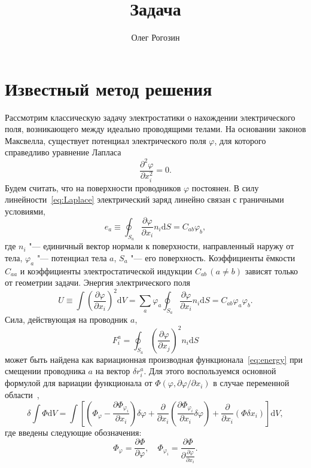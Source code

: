 \documentclass{article}
\title{Задача}
\author{Олег Рогозин}
\theoremstyle{plain}
\newcommand{\dd}{\mathrm{d}}
\newcommand{\pder}[2][]{\frac{\partial#1}{\partial#2}}
\newcommand{\pderdual}[2][]{\frac{\partial^2#1}{\partial#2^2}}
\newcommand{\Pder}[2][]{\partial#1/\partial#2}
\newcommand{\eqdef}{\equiv}
\begin{document}
\section{Известный метод решения}

Рассмотрим классическую задачу электростатики о нахождении электрического поля,
возникающего между идеально проводящими телами. На основании законов Максвелла,
существует потенциал электрического поля \(\varphi\), для которого справедливо
уравнение Лапласа
\begin{equation}\label{eq:Laplace}
    \pderdual[\varphi]{x_i} = 0.
\end{equation}
Будем считать, что на поверхности проводников \(\varphi\) постоянен.
В силу линейности~\eqref{eq:Laplace} электрический заряд линейно связан с граничными условиями,
\begin{equation}\label{eq:charge}
    e_a \eqdef \oint_{S_a} \pder[\varphi]{x_i}n_i\dd{S} = C_{ab} \varphi_b,
\end{equation}
где \(n_i\) "--- единичный вектор нормали к поверхности, направленный наружу от тела,
\(\varphi_a\) "--- потенциал тела \(a\), \(S_a\) "--- его поверхность.
Коэффициенты ёмкости \(C_{aa}\) и коэффициенты электростатической индукции \(C_{ab}\,(a\neq b)\)
зависят только от геометрии задачи.
Энергия электрического поля
\begin{equation}\label{eq:energy}
    U \eqdef \int \left(\pder[\varphi]{x_i}\right)^2\dd{V} =
    \sum_a \varphi_a \oint_{S_a} \pder[\varphi]{x_i}n_i\dd{S} = C_{ab} \varphi_a \varphi_b.
\end{equation}
Сила, действующая на проводник \(a\),
\begin{equation}\label{eq:force}
    F^a_i = \oint_{S_a} \left(\pder[\varphi]{x_j}\right)^2 n_i\dd{S}
\end{equation}
может быть найдена как вариационная производная функционала~\eqref{eq:energy}
при смещении проводника \(a\) на вектор \(\delta r^a_i\).
Для этого воспользуемся основной формулой для вариации функционала от \(\Phi(\varphi,\Pder[\varphi]{x_i})\)
в случае переменной области~\cite{Gelfand1961},
\begin{equation}\label{eq:variation_general}
    \delta \int \Phi \dd{V} = \int \left[
        \left( \Phi_\varphi - \pder[\Phi_{\varphi_i}]{x_i} \right) \delta\varphi +
        \pder{x_i}\left( \pder[\Phi_{\varphi_i}]{x_i} \delta\varphi \right) +
        \pder{x_i}\left( \Phi \delta x_i \right)
    \right]\dd{V},
\end{equation}
где введены следующие обозначения:
\begin{equation}\label{eq:Phi_derivatives}
    \Phi_\varphi = \pder[\Phi]{\varphi}, \quad \Phi_{\varphi_i} = \pder[\Phi]{\pder[\varphi]{x_i}}.
\end{equation}
\end{document}
